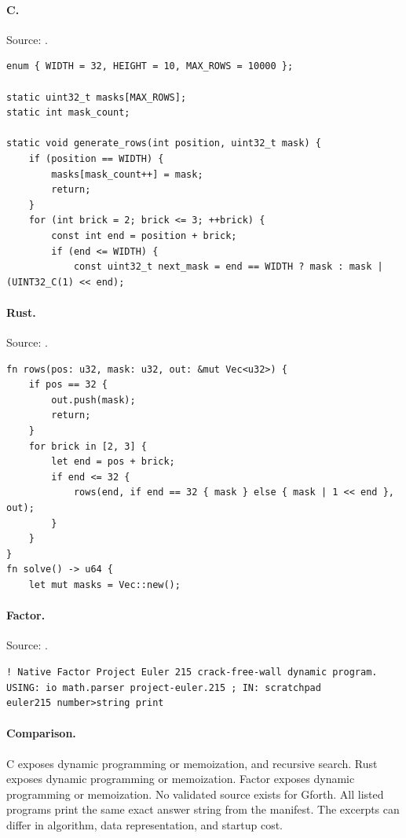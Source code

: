\paragraph{C.} Source: .
\begin{lstlisting}
enum { WIDTH = 32, HEIGHT = 10, MAX_ROWS = 10000 };

static uint32_t masks[MAX_ROWS];
static int mask_count;

static void generate_rows(int position, uint32_t mask) {
    if (position == WIDTH) {
        masks[mask_count++] = mask;
        return;
    }
    for (int brick = 2; brick <= 3; ++brick) {
        const int end = position + brick;
        if (end <= WIDTH) {
            const uint32_t next_mask = end == WIDTH ? mask : mask | (UINT32_C(1) << end);
\end{lstlisting}

\paragraph{Rust.} Source: .
\begin{lstlisting}
fn rows(pos: u32, mask: u32, out: &mut Vec<u32>) {
    if pos == 32 {
        out.push(mask);
        return;
    }
    for brick in [2, 3] {
        let end = pos + brick;
        if end <= 32 {
            rows(end, if end == 32 { mask } else { mask | 1 << end }, out);
        }
    }
}
fn solve() -> u64 {
    let mut masks = Vec::new();
\end{lstlisting}

\paragraph{Factor.} Source: .
\begin{lstlisting}
! Native Factor Project Euler 215 crack-free-wall dynamic program.
USING: io math.parser project-euler.215 ; IN: scratchpad
euler215 number>string print
\end{lstlisting}

\paragraph{Comparison.}
C exposes dynamic programming or memoization, and recursive search. Rust exposes dynamic programming or memoization. Factor exposes dynamic programming or memoization.
No validated source exists for Gforth.
All listed programs print the same exact answer string from the manifest. The excerpts can differ in algorithm, data representation, and startup cost.

